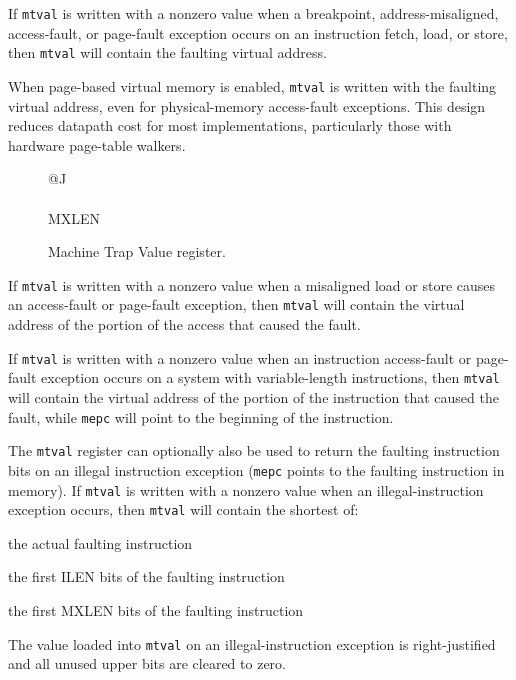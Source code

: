 If {\tt mtval} is written with a nonzero value when a breakpoint,
address-misaligned, access-fault, or page-fault exception occurs on an
instruction fetch, load, or store, then {\tt mtval} will contain the faulting
virtual address.

\begin{commentary}
  When page-based virtual memory is enabled, {\tt mtval} is written with
  the faulting virtual address, even for physical-memory access-fault exceptions.
  This design reduces datapath cost for most implementations, particularly
  those with hardware page-table walkers.
\end{commentary}

\begin{figure}[h!]
{\footnotesize
\begin{center}
\begin{tabular}{@{}J}
 \\
\hline
{} \\
\hline
MXLEN \\
\end{tabular}
\end{center}
}
\vspace{-0.1in}
\caption{Machine Trap Value register.}
\label{mtvalreg}
\end{figure}

If {\tt mtval} is written with a nonzero value when a misaligned load or store
causes an access-fault or page-fault exception, then {\tt mtval} will contain
the virtual address of the portion of the access that caused the fault.

If {\tt mtval} is written with a nonzero value when an instruction
access-fault or page-fault exception occurs on a system with variable-length
instructions, then {\tt mtval} will contain the virtual address of the portion
of the instruction that caused the fault, while {\tt mepc} will point to the
beginning of the instruction.

The {\tt mtval} register can optionally also be used to return the faulting
instruction bits on an illegal instruction exception ({\tt mepc} points to the
faulting instruction in memory).
If {\tt mtval} is written with a nonzero value when an illegal-instruction
exception occurs, then {\tt mtval} will contain the shortest of:
\begin{compactitem}
\item the actual faulting instruction
\item the first ILEN bits of the faulting instruction
\item the first MXLEN bits of the faulting instruction
\end{compactitem}
The value loaded into {\tt mtval} on an illegal-instruction exception is
right-justified and all unused upper bits are cleared to zero.

